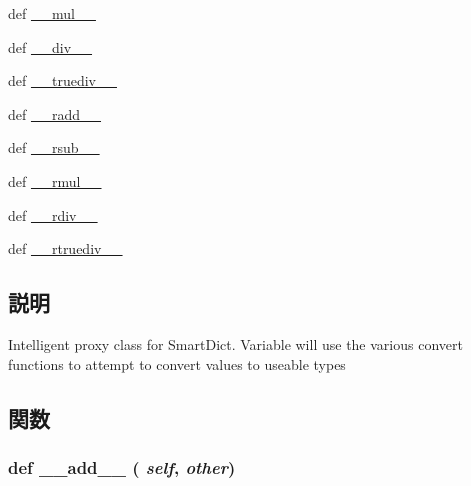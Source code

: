 \begin{DoxyCompactItemize}
\item 
def \hyperlink{classm5_1_1util_1_1smartdict_1_1Variable_a48a7267a9f9d29d1514e713744202146}{\_\-\_\-mul\_\-\_\-}
\item 
def \hyperlink{classm5_1_1util_1_1smartdict_1_1Variable_ac3c5c39796d9cc1889749840f456b3e5}{\_\-\_\-div\_\-\_\-}
\item 
def \hyperlink{classm5_1_1util_1_1smartdict_1_1Variable_a5249a29f5fba6860c17e6f8f04e2a6f9}{\_\-\_\-truediv\_\-\_\-}
\item 
def \hyperlink{classm5_1_1util_1_1smartdict_1_1Variable_a6c4d3a579d0fd0dc4796630edc287194}{\_\-\_\-radd\_\-\_\-}
\item 
def \hyperlink{classm5_1_1util_1_1smartdict_1_1Variable_a26684466f80bb9a04c0ce1d592b89251}{\_\-\_\-rsub\_\-\_\-}
\item 
def \hyperlink{classm5_1_1util_1_1smartdict_1_1Variable_a1f6ed07429726fb8ffc131d2fea52662}{\_\-\_\-rmul\_\-\_\-}
\item 
def \hyperlink{classm5_1_1util_1_1smartdict_1_1Variable_af32e4a451632afde7f8e9d45146b56cf}{\_\-\_\-rdiv\_\-\_\-}
\item 
def \hyperlink{classm5_1_1util_1_1smartdict_1_1Variable_ac1649bc3921cc74d327ac43cafaab179}{\_\-\_\-rtruediv\_\-\_\-}
\end{DoxyCompactItemize}


\subsection{説明}
\begin{DoxyVerb}Intelligent proxy class for SmartDict.  Variable will use the
various convert functions to attempt to convert values to useable
types\end{DoxyVerb}
 

\subsection{関数}
\hypertarget{classm5_1_1util_1_1smartdict_1_1Variable_ae92943b217d29a45ddcbbba2f7208afc}{
\subsubsection[{\_\-\_\-add\_\-\_\-}]{\setlength{\rightskip}{0pt plus 5cm}def \_\-\_\-add\_\-\_\- ( {\em self}, \/   {\em other})}}
\label{classm5_1_1util_1_1smartdict_1_1Variable_ae92943b217d29a45ddcbbba2f7208afc}



